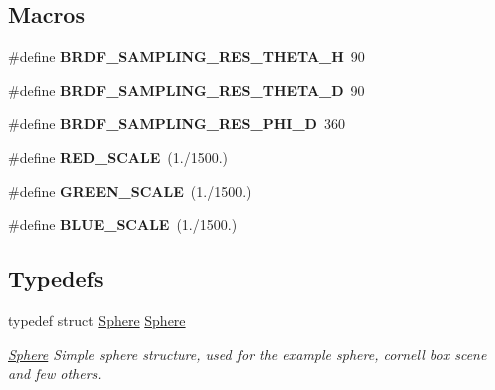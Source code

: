 \subsection*{Macros}
\begin{DoxyCompactItemize}
\item 
\hypertarget{PathTracer_8cu_a8dc71902a3c956140d3533820b1ef731}{\#define {\bfseries B\-R\-D\-F\-\_\-\-S\-A\-M\-P\-L\-I\-N\-G\-\_\-\-R\-E\-S\-\_\-\-T\-H\-E\-T\-A\-\_\-\-H}~90}\label{PathTracer_8cu_a8dc71902a3c956140d3533820b1ef731}

\item 
\hypertarget{PathTracer_8cu_a91bb2b846851bbcfbf4d5e0040c867df}{\#define {\bfseries B\-R\-D\-F\-\_\-\-S\-A\-M\-P\-L\-I\-N\-G\-\_\-\-R\-E\-S\-\_\-\-T\-H\-E\-T\-A\-\_\-\-D}~90}\label{PathTracer_8cu_a91bb2b846851bbcfbf4d5e0040c867df}

\item 
\hypertarget{PathTracer_8cu_aa2ccfe1ed7a38e1147f3ede37fadc3cc}{\#define {\bfseries B\-R\-D\-F\-\_\-\-S\-A\-M\-P\-L\-I\-N\-G\-\_\-\-R\-E\-S\-\_\-\-P\-H\-I\-\_\-\-D}~360}\label{PathTracer_8cu_aa2ccfe1ed7a38e1147f3ede37fadc3cc}

\item 
\hypertarget{PathTracer_8cu_acf3f1b403789e38a95ccb2407c151be5}{\#define {\bfseries R\-E\-D\-\_\-\-S\-C\-A\-L\-E}~(1./1500.)}\label{PathTracer_8cu_acf3f1b403789e38a95ccb2407c151be5}

\item 
\hypertarget{PathTracer_8cu_adcde58c7b09df0bb410fbabd1fddaf3c}{\#define {\bfseries G\-R\-E\-E\-N\-\_\-\-S\-C\-A\-L\-E}~(1./1500.)}\label{PathTracer_8cu_adcde58c7b09df0bb410fbabd1fddaf3c}

\item 
\hypertarget{PathTracer_8cu_ab4be50e26575571331b47f2df98916a5}{\#define {\bfseries B\-L\-U\-E\-\_\-\-S\-C\-A\-L\-E}~(1./1500.)}\label{PathTracer_8cu_ab4be50e26575571331b47f2df98916a5}

\end{DoxyCompactItemize}
\subsection*{Typedefs}
\begin{DoxyCompactItemize}
\item 
\hypertarget{PathTracer_8cu_a8ed9f74716eba6a3b5dd5d8c4f04fea6}{typedef struct \hyperlink{structSphere}{Sphere} \hyperlink{PathTracer_8cu_a8ed9f74716eba6a3b5dd5d8c4f04fea6}{Sphere}}\label{PathTracer_8cu_a8ed9f74716eba6a3b5dd5d8c4f04fea6}

\begin{DoxyCompactList}\small\item\em \hyperlink{structSphere}{Sphere} Simple sphere structure, used for the example sphere, cornell box scene and few others. \end{DoxyCompactList}\end{DoxyCompactItemize}
